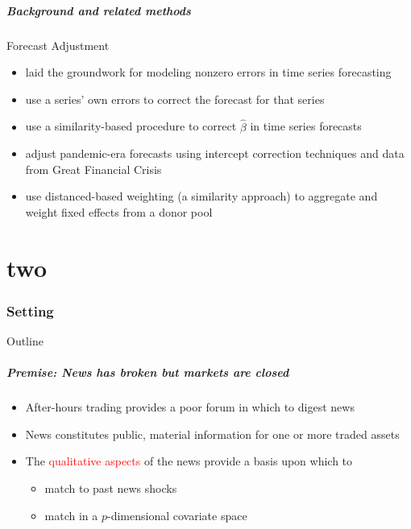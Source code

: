 \documentclass[9pt]{beamer}
\theoremstyle{definition}
\begin{document}
\begin{frame}
    \frametitle{Background and related methods}

    Forecast Adjustment
    \begin{itemize}
        \item \cite[][]{clements1996intercept,clements1998forecasting} laid the groundwork for modeling nonzero errors in time series forecasting
        \item \cite[][]{guerron2017macroeconomic} use a series' own errors to correct the forecast for that series
        \item \cite[][]{dendramis2020similarity} use a similarity-based procedure to correct $\hat\beta$ in time series forecasts
        \item \cite[][]{foroni2022forecasting} adjust pandemic-era forecasts using intercept correction techniques and data from Great Financial Crisis
        \item \cite[][]{lin2021minimizing} use distanced-based weighting (a similarity approach) to aggregate and weight fixed effects from a donor pool
    \end{itemize}
\end{frame}

\part{two}
\section{Setting}
\begin{frame}{Outline} %
    \tableofcontents[part=1,currentsection]\tableofcontents
\end{frame}


\begin{frame}
\frametitle{Premise: News has broken but markets are closed}

\begin{itemize}
\item After-hours trading provides a poor forum in which to digest news
\item News constitutes public, material information for one or more traded assets
\item The \textcolor{red}{qualitative aspects} of the news provide a basis upon which to 
\begin{itemize}
    \item match to past news shocks
    \item match in a $p$-dimensional covariate space
\end{itemize}
\end{itemize}
\end{frame}
\end{document}
